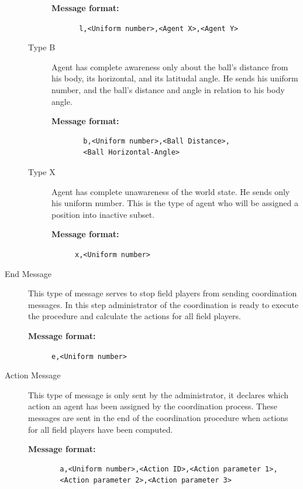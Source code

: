 \begin{description}
\begin{description}
\begin{description}
  \item[{\bf Message format:}]
  \texttt{ l,<Uniform number>,<Agent X>,<Agent Y>}
\end{description}

\item[Type B] Agent has complete awareness only about the ball's distance from his body, its horizontal, and its latitudal angle. He sends his uniform number,  and the ball's distance and angle in relation to his body angle.

\begin{description}
  \item[{\bf Message format:}]
  \begin{verbatim}  
  b,<Uniform number>,<Ball Distance>,
  <Ball Horizontal-Angle>\end{verbatim}
\end{description}

\item[Type X] Agent has complete unawareness of the world state. He sends only his uniform number. This is the type of agent who will be assigned a position into inactive subset.

\begin{description}
 \item[{\bf Message format:}]
 \texttt{x,<Uniform number>}
\end{description}

\end{description}
\item[End Message]
This type of message serves to stop field players from sending coordination messages. In this step administrator of the coordination is ready to execute the procedure and calculate the actions for all field players.
\begin{description}
  \item[{\bf Message format:}] 
  \texttt{e,<Uniform number>}
\end{description}
\item[Action Message]
This type of message is only sent by the administrator, it declares which action an agent has been assigned by the coordination process. These messages are sent in the end of the coordination procedure when actions for all field players have been computed.
\begin{description}
  \item[{\bf Message format:}]
  \begin{verbatim}
  a,<Uniform number>,<Action ID>,<Action parameter 1>,
  <Action parameter 2>,<Action parameter 3>\end{verbatim}
\end{description}

\end{description}

